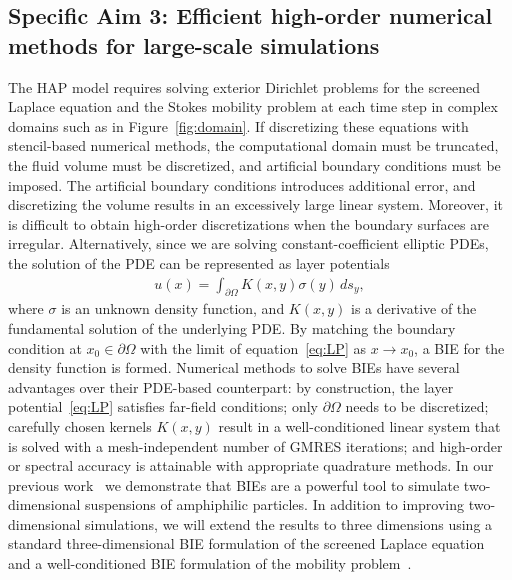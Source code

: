 
\subsection{Specific Aim 3: Efficient high-order numerical methods for
large-scale simulations}
\label{subsec:specific_aim_3}
The HAP model requires solving exterior Dirichlet problems for the
screened Laplace equation and the Stokes mobility problem at each time
step in complex domains such as in Figure~\ref{fig:domain}. If
discretizing these equations with stencil-based numerical methods, the
computational domain must be truncated, the fluid volume must be
discretized, and artificial boundary conditions must be imposed. The
artificial boundary conditions introduces additional error, and
discretizing the volume results in an excessively large linear system.
Moreover, it is difficult to obtain high-order discretizations when the
boundary surfaces are irregular. Alternatively, since we are solving
constant-coefficient elliptic PDEs, the solution of the PDE can be
represented as layer potentials
\begin{align}
  \label{eq:LP}
  u(x) = \int_{\partial\Omega} K(x,y) \sigma(y)\,ds_y,
\end{align}
where $\sigma$ is an unknown density function, and $K(x,y)$ is a
derivative of the fundamental solution of the underlying PDE. By
matching the boundary condition at $x_0 \in \partial\Omega$ with the
limit of equation~\eqref{eq:LP} as $x\rightarrow x_0$, a BIE for the
density function is formed. Numerical methods to solve BIEs have several
advantages over their PDE-based counterpart: by construction, the layer
potential~\eqref{eq:LP} satisfies far-field conditions; only
$\partial\Omega$ needs to be discretized; carefully chosen kernels
$K(x,y)$ result in a well-conditioned linear system that is solved with
a mesh-independent number of GMRES iterations; and high-order or
spectral accuracy is attainable with appropriate quadrature methods. In
our previous work~\cite{Fu2018_SIAM} we demonstrate that BIEs are a
powerful tool to simulate two-dimensional suspensions of amphiphilic
particles. In addition to improving two-dimensional simulations, we will
extend the results to three dimensions using a standard
three-dimensional BIE formulation of the screened Laplace
equation~\cite{ying_2006} and a well-conditioned BIE formulation of the
mobility problem~\cite{manasthesis, rac-gre2016}.

